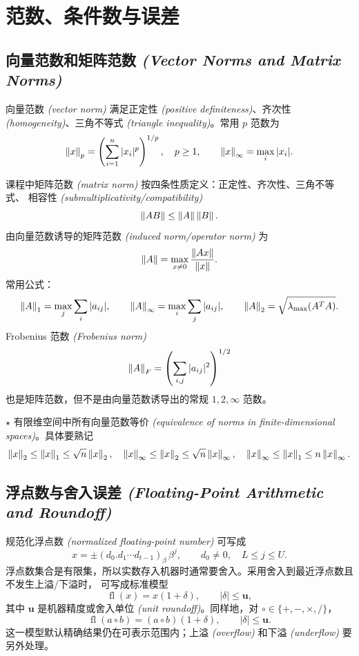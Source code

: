\documentclass{article}
\newcommand{\fl}{\operatorname{fl}}
\newcommand{\keypoint}{\textcolor{red!65!black}{\textbf{$\star$}}}
\newcommand{\eng}[1]{\texorpdfstring{{\normalfont\rmfamily\itshape\textcolor{blue!65!black}{(#1)}}}{(#1)}}
\begin{document}
\section{范数、条件数与误差}

\subsection{向量范数和矩阵范数 \eng{Vector Norms and Matrix Norms}}

向量范数 \eng{vector norm} 满足正定性 \eng{positive definiteness}、齐次性
\eng{homogeneity}、三角不等式 \eng{triangle inequality}。常用 $p$ 范数为
\[
  \left\| x \right\|_p=\left(\sum_{i=1}^n |x_i|^p\right)^{1/p},\quad p\ge1,\qquad
  \left\| x \right\|_\infty=\max_i |x_i|.
\]

课程中矩阵范数 \eng{matrix norm} 按四条性质定义：正定性、齐次性、三角不等式、
相容性 \eng{submultiplicativity/compatibility}
\[
  \left\| AB \right\|\le\left\| A \right\|\left\| B \right\|.
\]
由向量范数诱导的矩阵范数 \eng{induced norm/operator norm} 为
\[
  \left\| A \right\|=\max_{x\ne0}\frac{\left\| Ax \right\|}{\left\| x \right\|}.
\]
常用公式：
\[
  \left\| A \right\|_1=\max_j\sum_i |a_{ij}|,\qquad
  \left\| A \right\|_\infty=\max_i\sum_j |a_{ij}|,\qquad
  \left\| A \right\|_2=\sqrt{\lambda_{\max}(A^TA)}.
\]
Frobenius 范数 \eng{Frobenius norm}
\[
  \left\| A \right\|_F=\left(\sum_{i,j}|a_{ij}|^2\right)^{1/2}
\]
也是矩阵范数，但不是由向量范数诱导出的常规 $1,2,\infty$ 范数。

\keypoint{} 有限维空间中所有向量范数等价 \eng{equivalence of norms in finite-dimensional spaces}。具体要熟记
\[
  \left\| x \right\|_2\le\left\| x \right\|_1\le\sqrt n\left\| x \right\|_2,\quad
  \left\| x \right\|_\infty\le\left\| x \right\|_2\le\sqrt n\left\| x \right\|_\infty,\quad
  \left\| x \right\|_\infty\le\left\| x \right\|_1\le n\left\| x \right\|_\infty.
\]

\subsection{浮点数与舍入误差 \eng{Floating-Point Arithmetic and Roundoff}}

规范化浮点数 \eng{normalized floating-point number} 可写成
\[
  x=\pm(d_0.d_1\cdots d_{t-1})_\beta\,\beta^j,\qquad
  d_0\ne0,\quad L\le j\le U.
\]
浮点数集合是有限集，所以实数存入机器时通常要舍入。采用舍入到最近浮点数且不发生上溢/下溢时，
可写成标准模型
\[
  \fl(x)=x(1+\delta),\qquad |\delta|\le \mathbf u,
\]
其中 $\mathbf u$ 是机器精度或舍入单位 \eng{unit roundoff}。同样地，对
$\circ\in\{+,-,\times,/\}$，
\[
  \fl(a\circ b)=(a\circ b)(1+\delta),\qquad |\delta|\le\mathbf u.
\]
这一模型默认精确结果仍在可表示范围内；上溢 \eng{overflow} 和下溢 \eng{underflow}
要另外处理。
\end{document}
